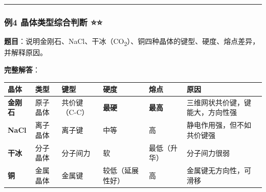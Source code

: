 \documentclass[a4paper,11pt]{ctexart}
\newcounter{none}
\begin{document}
\begin{center}\rule{0.5\linewidth}{0.5pt}\end{center}

\subsubsection{例4 晶体类型综合判断 ⭐⭐}\label{ux4f8b4-ux6676ux4f53ux7c7bux578bux7efcux5408ux5224ux65ad}

\textbf{题目}：说明金刚石、NaCl、干冰（CO\textsubscript{2}）、铜四种晶体的键型、硬度、熔点差异，并解释原因。

\textbf{完整解答}：

{\def\LTcaptype{none} %
\begin{longtable}[]{@{}
  >{\raggedright\arraybackslash}p{}
  >{\raggedright\arraybackslash}p{}
  >{\raggedright\arraybackslash}p{}
  >{\centering\arraybackslash}p{}
  >{\centering\arraybackslash}p{}
  >{\raggedright\arraybackslash}p{}@{}}
\toprule\noalign{}
\begin{minipage}[b]{\linewidth}\raggedright
晶体
\end{minipage} & \begin{minipage}[b]{\linewidth}\raggedright
类型
\end{minipage} & \begin{minipage}[b]{\linewidth}\raggedright
键型
\end{minipage} & \begin{minipage}[b]{\linewidth}\centering
硬度
\end{minipage} & \begin{minipage}[b]{\linewidth}\centering
熔点
\end{minipage} & \begin{minipage}[b]{\linewidth}\raggedright
原因
\end{minipage} \\
\midrule\noalign{}
\endhead
\bottomrule\noalign{}
\endlastfoot
\textbf{金刚石} & 原子晶体 & 共价键（C-C） & \textbf{最硬} & \textbf{最高} & 三维网状共价键，键能大，方向性强 \\
\textbf{NaCl} & 离子晶体 & 离子键 & 中等 & 高 & 静电作用强，但不如共价键强 \\
\textbf{干冰} & 分子晶体 & 分子间力 & 软 & 最低（升华） & 分子间力很弱 \\
\textbf{铜} & 金属晶体 & 金属键 & 较低（延展性好） & 高 & 金属键无方向性，可滑移 \\
\end{longtable}
}
\end{document}
